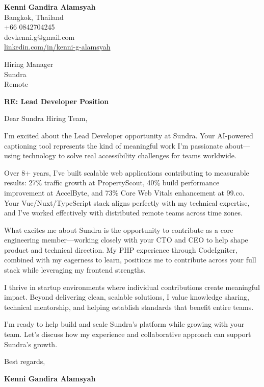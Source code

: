 \documentclass[11pt]{article}
\begin{document}
\begin{flushleft}
\textbf{Kenni Gandira Alamsyah}\\
Bangkok, Thailand\\
+66 0842704245\\
devkenni.g@gmail.com\\
\href{https://www.linkedin.com/in/kenni-g-alamsyah/}{linkedin.com/in/kenni-g-alamsyah}
\end{flushleft}

\vspace{1em}

\begin{flushleft}
Hiring Manager\\
Sundra\\
Remote
\end{flushleft}

\vspace{1em}

\textbf{RE: Lead Developer Position}

\vspace{1em}

Dear Sundra Hiring Team,

I'm excited about the Lead Developer opportunity at Sundra. Your AI-powered captioning tool represents the kind of meaningful work I'm passionate about—using technology to solve real accessibility challenges for teams worldwide.

Over 8+ years, I've built scalable web applications contributing to measurable results: 27\% traffic growth at PropertyScout, 40\% build performance improvement at AccelByte, and 73\% Core Web Vitals enhancement at 99.co. Your Vue/Nuxt/TypeScript stack aligns perfectly with my technical expertise, and I've worked effectively with distributed remote teams across time zones.

What excites me about Sundra is the opportunity to contribute as a core engineering member—working closely with your CTO and CEO to help shape product and technical direction. My PHP experience through CodeIgniter, combined with my eagerness to learn, positions me to contribute across your full stack while leveraging my frontend strengths.

I thrive in startup environments where individual contributions create meaningful impact. Beyond delivering clean, scalable solutions, I value knowledge sharing, technical mentorship, and helping establish standards that benefit entire teams.

I'm ready to help build and scale Sundra's platform while growing with your team. Let's discuss how my experience and collaborative approach can support Sundra's growth.

\vspace{1em}

Best regards,

\textbf{Kenni Gandira Alamsyah}
\end{document}
